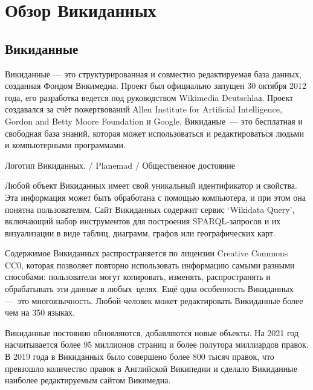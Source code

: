\chapter{Обзор Викиданных}
\label{ch:ReviewAboutWD}

\section{Викиданные}
Викиданные — это структурированная и совместно редактируемая база данных, созданная Фондом Викимедиа\footnotemark {}. Проект был официально запущен 30 октября 2012 года, его разработка ведется под руководством Wikimedia Deutschlaа\footnotemark {}. Проект создавался за счёт пожертвований Allen Institute for Artificial Intelligence, Gordon and Betty Moore Foundation и Google. Викиданые — это бесплатная и свободная база знаний, которая может использоваться и редактироваться людьми и компьютерными программами\cite{Vrandecic}.\begin{marginfigure}[0.0cm]
{
	\setlength{\fboxsep}{0pt}%
	\setlength{\fboxrule}{1pt}%
}
\caption
{Логотип Викиданных.  / Planemad / Общественное достояние
}
\label{fig:seyu}
\end{marginfigure}

Любой объект Викиданных имеет свой уникальный идентификатор и свойства. Эта информация может быть обработана с помощью компьютера, и при этом она понятна пользователям. Сайт Викиданных содержит сервис ‘Wikidata Query’, включающий набор инструментов для построения SPARQL-запросов и их визуализации в виде таблиц, диаграмм, графов или географических карт.

Содержимое Викиданных распространяется по лицензии Creative Commons CC0, которая позволяет повторно использовать информацию самыми разными способами: пользователи могут копировать, изменять, распространять и обрабатывать эти данные в любых целях. Ещё одна особенность Викиданных --- это многоязычность. Любой человек может редактировать Викиданные более чем на 350 языках.

Викиданные постоянно обновляются, добавляются новые объекты. На 2021 год насчитывается более 95 миллионов страниц и более полутора миллиардов правок\footnotemark.  В 2019 года в Викиданных было совершено более 800 тысяч правок, что превзошло количество правок в Английской Википедии и сделало Викиданные наиболее редактируемым сайтом Викимедиа\footnotemark . 
